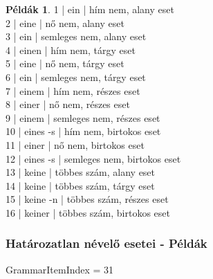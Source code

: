 \documentclass{article}
\theoremstyle{definition}
\newtheorem*{exmp}{Példák}
\begin{document}
\begin{exmp}
1 | ein | hím nem, alany eset\\
2 | eine | nő nem, alany eset\\
3 | ein | semleges nem, alany eset\\
4 | einen | hím nem, tárgy eset\\
5 | eine | nő nem, tárgy eset\\
6 | ein | semleges nem, tárgy eset\\
7 | einem | hím nem, részes eset\\
8 | einer | nő nem, részes eset\\
9 | einem | semleges nem, részes eset\\
10 | eines -s | hím nem, birtokos eset\\
11 | einer | nő nem, birtokos eset\\
12 | eines -s | semleges nem, birtokos eset\\
13 | keine | többes szám, alany eset\\
14 | keine | többes szám, tárgy eset\\
15 | keine -n | többes szám, részes eset\\
16 | keiner | többes szám, birtokos eset\\
\end{exmp}

\subsubsection{Határozatlan névelő esetei - Példák}

GrammarItemIndex = 31
\end{document}
